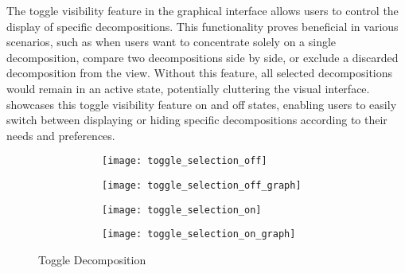 The toggle visibility feature in the graphical interface allows users to
control the display of specific decompositions. This functionality proves
beneficial in various scenarios, such as when users want to concentrate solely
on a single decomposition, compare two decompositions side by side, or exclude
a discarded decomposition from the view. Without this feature, all selected
decompositions would remain in an active state, potentially cluttering the
visual interface.  showcases this toggle
visibility feature on and off states, enabling users to easily switch between
displaying or hiding specific decompositions according to their needs and
preferences.

\begin{figure*}[!htb]
  \centering
  \begin{subfigure}[!htb]{1\textwidth}
    \caption{Off State}
    \centering
    \begin{subfigure}[b]{0.49\textwidth}
      \centering
      \texttt{[image: toggle\_selection\_off]}
    \end{subfigure}
    \hspace{-0.1cm}
    \begin{subfigure}[b]{0.49\textwidth}
      \centering
      \texttt{[image: toggle\_selection\_off\_graph]}
    \end{subfigure}
  \end{subfigure}
  \hfill
  \begin{subfigure}[!htb]{1\textwidth}
    \caption{On State}
    \centering
    \begin{subfigure}[b]{0.49\textwidth}
      \centering
      \texttt{[image: toggle\_selection\_on]}
    \end{subfigure}
    \hspace{-0.1cm}
    \begin{subfigure}[b]{0.49\textwidth}
      \centering
      \texttt{[image: toggle\_selection\_on\_graph]}
    \end{subfigure}
  \end{subfigure}
  \caption{Toggle Decomposition}
  \label{fig:toggle_decomposition}
\end{figure*}
